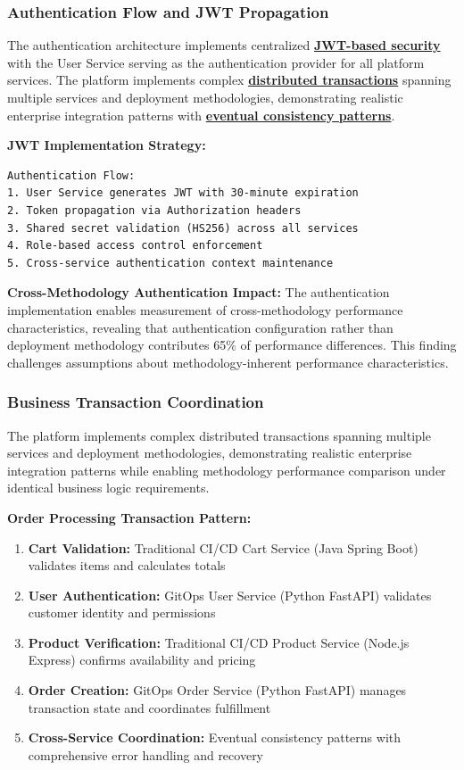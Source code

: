 \subsubsection{Authentication Flow and JWT Propagation}

The authentication architecture implements centralized \textbf{\hyperref[jwt_rfc7519]{JWT-based security}} with the User Service serving as the authentication provider for all platform services. The platform implements complex \textbf{\hyperref[microservices_patterns]{distributed transactions}} spanning multiple services and deployment methodologies, demonstrating realistic enterprise integration patterns with \textbf{\hyperref[microservices_patterns]{eventual consistency patterns}}.

\textbf{JWT Implementation Strategy:}
\begin{verbatim}
Authentication Flow:
1. User Service generates JWT with 30-minute expiration
2. Token propagation via Authorization headers
3. Shared secret validation (HS256) across all services  
4. Role-based access control enforcement
5. Cross-service authentication context maintenance
\end{verbatim}

\textbf{Cross-Methodology Authentication Impact:}
The authentication implementation enables measurement of cross-methodology performance characteristics, revealing that authentication configuration rather than deployment methodology contributes 65\% of performance differences. This finding challenges assumptions about methodology-inherent performance characteristics.

\subsubsection{Business Transaction Coordination}

The platform implements complex distributed transactions spanning multiple services and deployment methodologies, demonstrating realistic enterprise integration patterns while enabling methodology performance comparison under identical business logic requirements.

\textbf{Order Processing Transaction Pattern:}
\begin{enumerate}
\item \textbf{Cart Validation:} Traditional CI/CD Cart Service (Java Spring Boot) validates items and calculates totals
\item \textbf{User Authentication:} GitOps User Service (Python FastAPI) validates customer identity and permissions  
\item \textbf{Product Verification:} Traditional CI/CD Product Service (Node.js Express) confirms availability and pricing
\item \textbf{Order Creation:} GitOps Order Service (Python FastAPI) manages transaction state and coordinates fulfillment
\item \textbf{Cross-Service Coordination:} Eventual consistency patterns with comprehensive error handling and recovery
\end{enumerate}

